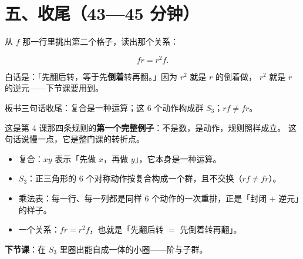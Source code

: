 \section*{五、收尾（43—45 分钟）}

从 \(f\) 那一行里挑出第二个格子，读出那个关系：

\[
  fr = r^2 f .
\]

白话是：「先翻后转，等于先\textbf{倒着}转再翻。」因为 \(r^2\) 就是 \(r\) 的倒着做，
\(r^2\) 就是 \(r\) 的逆元——下节课要用到。

板书三句话收尾：复合是一种运算；这 \(6\) 个动作构成群 \(S_3\)；\(rf\neq fr\)。

\begin{zhu}
  这是第 4 课那四条规则的\textbf{第一个完整例子}：不是数，是动作，规则照样成立。
  这句话说慢一点，它是整门课的转折点。
\end{zhu}

\begin{xiaojie}
  \begin{itemize}
    \item 复合：\(xy\) 表示「先做 \(x\)，再做 \(y\)」，它本身是一种运算。
    \item \(S_3\)：正三角形的 \(6\) 个对称动作按复合构成一个群，且不交换（\(rf\neq fr\)）。
    \item 乘法表：每一行、每一列都是同样 \(6\) 个动作的一次重排，正是「封闭 \(+\) 逆元」的样子。
    \item 一个关系：\(fr=r^2f\)，也就是「先翻后转 \(=\) 先倒着转再翻」。
  \end{itemize}
\end{xiaojie}

\noindent\textbf{下节课}：在 \(S_3\) 里圈出能自成一体的小圈——阶与子群。